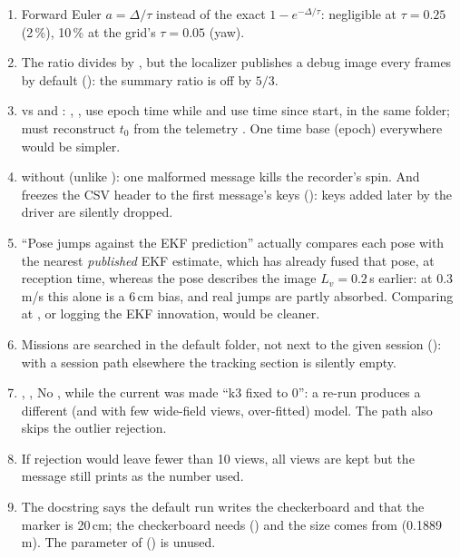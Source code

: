 \begin{review}
\begin{enumerate}[leftmargin=*,itemsep=2pt]
\item {} Forward Euler $a=\Delta/\tau$ instead of the exact $1-e^{-\Delta/\tau}$: negligible at
$\tau=0.25$ (2\,\%), 10\,\% at the grid's $\tau=0.05$ (yaw).
\item {} The ratio divides by , but the localizer publishes a debug
image every  frames by default (): the summary ratio is
off by $5/3$.
\item {} vs  and : , ,
 use epoch time while  and  use time since start, in the same
folder;  must reconstruct $t_0$ from the telemetry . One time base (epoch)
everywhere would be simpler.
\item {}  without  (unlike ): one
malformed message kills the recorder's spin. And  freezes the CSV header to the first message's keys
(): keys added later by the driver are silently dropped.
\item {} ``Pose jumps against the EKF prediction'' actually compares each pose with the
nearest \emph{published} EKF estimate, which has already fused that pose, at reception time, whereas the pose
describes the image $L_v = 0.2$\,s earlier: at 0.3\,m/s this alone is a 6\,cm bias, and real jumps are partly
absorbed. Comparing at , or logging the EKF innovation, would be cleaner.
\item {} Missions are searched in the default  folder, not next to the
given session (): with a session path elsewhere the tracking section is silently empty.
\item {}, ,  No , while the current
 was made ``k3 fixed to 0'': a re-run produces a different (and with few wide-field
views, over-fitted) model. The  path also skips the outlier rejection.
\item {} If rejection would leave fewer than 10 views, all views are kept but the
message still prints  as the number used.
\item {} The docstring says the default run writes the checkerboard and that the
marker is 20\,cm; the checkerboard needs  () and the size comes from
 (0.1889\,m). The  parameter of  () is unused.
\end{enumerate}
\end{review}

